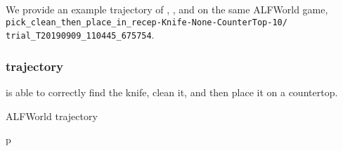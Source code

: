 We provide an example trajectory of \model{}, \act{}, and \modelim{} on the same ALFWorld game, \texttt{pick\_clean\_then\_place\_in\_recep-Knife-None-CounterTop-10/\\trial\_T20190909\_110445\_675754}.

\subsubsection{\model{} trajectory}
\label{appendix:react_ALFWorld_trajectory}

\model{} is able to correctly find the knife, clean it, and then place it on a countertop.

\begin{table}[H]
\scriptsize
\begin{minipage}{0.9\linewidth}
\model{} ALFWorld trajectory
\centering
\ttfamily
\begin{tabular}{p\linewidth}
\midrule


\end{tabular}
\end{minipage}
\end{table}

